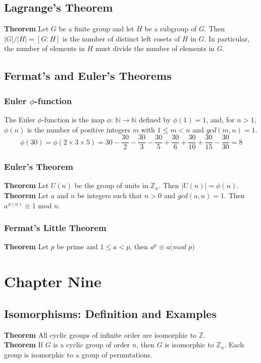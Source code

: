 \documentclass{article}
\begin{document}
\subsection{Lagrange's Theorem}
\textbf{Theorem}
Let $G$ be a finite group and let $H$ be a subgroup of $G$. Then $|G|/|H|=[G:H]$ is the number of distinct left cosets of $H$ in $G$. In particular, the number of elements in $H$ must divide the number of elements in $G$.
\subsection{Fermat's and Euler's Theorems}
\subsubsection{Euler $\phi$-function}
The Euler $\phi$-function is the map $\phi$: $\mathbb{N}\rightarrow \mathbb{N}$ defined by $\phi(1)=1$, and, for $n>1$, $\phi(n)$ is the number of positive integers $m$ with $1\leq m<n$ and $gcd(m,n)=1$.
$$\phi(30)=\phi(2\times 3\times 5)=30-\frac{30}{2}-\frac{30}{3}-\frac{30}{5}+\frac{30}{6}+\frac{30}{10}+\frac{30}{15}-\frac{30}{30}=8$$
\subsubsection{Euler's Theorem}
\textbf{Theorem}
Let $U(n)$ be the group of units in $\mathbb{Z}_n$. Then $|U(n)|=\phi(n)$.\\
\textbf{Theorem}
Let $a$ and $n$ be integers such that $n>0$ and $gcd(a,n)=1$. Then $a^{\phi(n)}\equiv 1$ mod $n$.
\subsubsection{Fermat's Little Theorem}
\textbf{Theorem}
Let $p$ be prime and $1\leq a<p$, then $a^p \equiv a(mod $ $p)$
\section{Chapter Nine}
\subsection{Isomorphisms: Definition and Examples}
\textbf{Theorem}
All cyclic groups of infinite order are isomorphic to $\mathbb{Z}$.\\
\textbf{Theorem}
If $G$ is a cyclic group of order $n$, then $G$ is isomorphic to $\mathbb{Z}_n$. Each group is isomorphic to a group of permutations.\\
\end{document}
